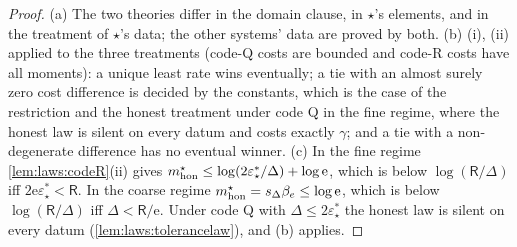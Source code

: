 \begin{proof}
(a) The two theories differ in the domain clause, in $\star$'s elements, and in the treatment of $\star$'s data; the other systems' data are proved by both. (b) (i), (ii) applied to the three treatments (code-Q costs are bounded and code-R costs have all moments): a unique least rate wins eventually; a tie with an almost surely zero cost difference is decided by the constants, which is the case of the restriction and the honest treatment under code Q in the fine regime, where the honest law is silent on every datum and costs exactly $\gamma$; and a tie with a non-degenerate difference has no eventual winner. (c) In the fine regime \cref{lem:laws:codeR}(ii) gives $m^\star_{\rm hon}\le\log(2\varepsilon^*_\star/\Delta)+\log\mathrm e$, which is below $\log(\mathsf R/\Delta)$ iff $2\mathrm e\varepsilon^*_\star<\mathsf R$. In the coarse regime $m^\star_{\rm hon}=s_\Delta\beta_e\le\log\mathrm e$, which is below $\log(\mathsf R/\Delta)$ iff $\Delta<\mathsf R/\mathrm e$. Under code Q with $\Delta\le2\varepsilon^*_\star$ the honest law is silent on every datum (\cref{lem:laws:tolerancelaw}), and (b) applies.
\end{proof}

